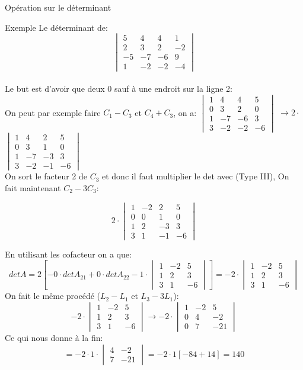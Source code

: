 \begin{parag}{Opération sur le déterminant}
\begin{subparag}{Exemple}
Le déterminant  de:
\[\begin{vmatrix}
5 & 4 & 4 & 1\\
2 & 3 & 2 & -2 \\
-5 & -7 & -6 & 9 \\
1 & -2 & -2 & -4
\end{vmatrix}\]
\\
Le but est d'avoir que deux 0 sauf à une endroit sur la ligne 2:
\\
On peut par exemple faire $C_1 - C_3$ et $C_4 + C_3$, on a:
$\begin{vmatrix}
1 & 4 & 4 & 5\\
0 & 3 & 2 & 0 \\
1 & -7 & -6 & 3 \\
3 & -2 & -2 & -6
\end{vmatrix}$ $\to 2\cdot$ $\begin{vmatrix} 
1 & 4 & 2 & 5\\
0 & 3 & 1 & 0 \\
1 & -7 & -3 & 3 \\
3 & -2 & -1 & -6
\end{vmatrix}$
\\
On sort le facteur 2 de $C_3$ et donc il faut multiplier le det avec (Type III), On fait maintenant $C_2 - 3C_3$:

 \[2\cdot\begin{vmatrix} 
1 & -2 & 2 & 5\\
0 & 0 & 1 & 0 \\
1 & 2 & -3 & 3 \\
3 & 1 & -1 & -6
\end{vmatrix}\]

En utilisant les cofacteur on a que:
\[ det A = 2[-0\cdot detA_{21} + 0\cdot detA_{22} -1\cdot \begin{vmatrix} 
1 & -2 & 5\\
1 & 2  & 3 \\
3 & 1  & -6
\end{vmatrix}] = -2\cdot\begin{vmatrix} 
1 & -2 & 5\\
1 & 2  & 3 \\
3 & 1  & -6
\end{vmatrix}\]
On fait le même procédé ($L_2 - L_1$ et $L_3 - 3L_1$):
\[ -2\cdot\begin{vmatrix} 
1 & -2 & 5\\
1 & 2  & 3 \\
3 & 1  & -6
\end{vmatrix} \to -2\cdot\begin{vmatrix} 
1 & -2 & 5\\
0 & 4  & -2 \\
0 & 7  & -21
\end{vmatrix}\]
Ce qui nous donne à la fin:
\[ = -2\cdot 1 \cdot \begin{vmatrix}
    4 & -2 \\
    7 & -21
\end{vmatrix} = -2\cdot 1 [-84 + 14] = 140\]



    
\end{subparag}
\end{parag}
